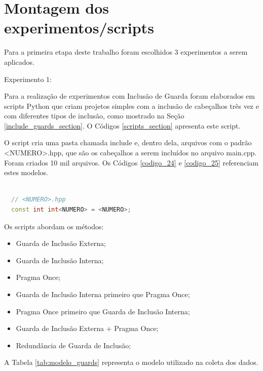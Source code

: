 \section{Montagem dos experimentos/scripts}

Para a primeira etapa deste trabalho foram escolhidos 3 experimentos a
 serem aplicados.

Experimento 1:

Para a realização de experimentos com Inclusão de Guarda foram elaborados
 em scripts Python que criam projetos simples com a inclusão de cabeçalhos
 três vez e com diferentes tipos de inclusão, como mostrado na  Seção
 \ref{include_guards_section}.
 O Códigos \ref{scripts_section} apresenta este script.

O script cria uma pasta chamada include e, dentro dela, arquivos com o padrão
 <NUMERO>.hpp, que são os cabeçalhos a serem incluídos no arquivo main.cpp.
 Foram criados 10 mil arquivos. Os Códigos \ref{codigo_24} e  \ref{codigo_25}
 referenciam estes modelos.



\begin{lstlisting}[language=C++,frame=single,caption={Código 24: Modelo de
									 Arquivo .hpp gerado pelos scripts de 
									  guardas de inclusão},
                                                   label=codigo_24]

  // <NUMERO>.hpp
  const int int<NUMERO> = <NUMERO>;

\end{lstlisting}


Os scripts abordam os métodos:

\begin{itemize}
	\item Guarda de Inclusão Externa;
	\item Guarda de Inclusão Interna;
	\item Pragma Once;
	\item Guarda de Inclusão Interna primeiro que Pragma Once;
	\item Pragma Once primeiro que  Guarda de Inclusão Interna;
	\item Guarda de Inclusão Externa + Pragma Once;
	\item Redundância de Guarda de Inclusão;
\end{itemize}


A Tabela \ref{tab:modelo_guards} representa o modelo utilizado na coleta dos
 dados.



